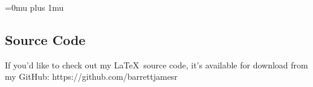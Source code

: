 \documentclass{article}
\begin{document}
\newpage

\Urlmuskip=0mu plus 1mu\relax

\nocite{*}


\begin{appendices}
\section{Source Code} \label{App:AppendixA}
If you'd like to check out my \LaTeX\ source code, it's available for download from my GitHub: https://github.com/barrettjamesr
\end{appendices}
\end{document}
